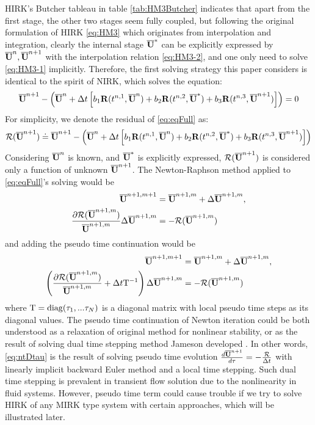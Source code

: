 \documentclass[preprint,12pt]{elsarticle}
\begin{document}
HIRK's Butcher tableau in table \ref{tab:HM3Butcher}
indicates that apart from the first stage,
the other two stages seem fully coupled,
but following the original formulation
of HIRK \eqref{eq:HM3} which originates from
interpolation and integration,
clearly the internal stage $\overline{\mathbf{U}}^*$ can be explicitly
expressed by $\overline{\mathbf{U}}^n, \overline{\mathbf{U}}^{n+1}$ with the interpolation
relation \eqref{eq:HM3-2}, and one only need
to solve \eqref{eq:HM3-1} implicitly.
Therefore, the first solving strategy this paper
considers is identical to the spirit of NIRK,
which solves the equation:
\begin{equation}
    \label{eq:eqFull}
    \overline{\mathbf{U}}^{n+1} -
    \left(\overline{\mathbf{U}}^{n} + \mathrm\Delta t
    \left[
        b_1\mathbf{R}(t^{n,1}, \overline{\mathbf{U}}^n) +
        b_2\mathbf{R}(t^{n,2}, \overline{\mathbf{U}}^*) +
        b_3\mathbf{R}(t^{n,3}, \overline{\mathbf{U}}^{n+1})
        \right]
    \right)  =  0
\end{equation}
For simplicity, we denote the residual of \eqref{eq:eqFull}
as:
\begin{equation}
    \mathcal{R}(\overline{\mathbf{U}}^{n+1}) \doteq \overline{\mathbf{U}}^{n+1} -
    \left(\overline{\mathbf{U}}^{n} + \mathrm\Delta t
    \left[
        b_1\mathbf{R}(t^{n,1}, \overline{\mathbf{U}}^{n}) +
        b_2\mathbf{R}(t^{n,2}, \overline{\mathbf{U}}^{*}) +
        b_3\mathbf{R}(t^{n,3}, \overline{\mathbf{U}}^{n+1})
        \right]
    \right)
\end{equation}
Considering $\overline{\mathbf{U}}^{n}$ is known,
and $\overline{\mathbf{U}}^{*}$ is explicitly expressed,
$\mathcal{R}(\overline{\mathbf{U}}^{n+1})$ is considered only a
function of unknown $\overline{\mathbf{U}}^{n+1}$.
The Newton-Raphson method applied to
\eqref{eq:eqFull}'s solving would be
\begin{equation}
    \begin{aligned}
        \overline{\mathbf{U}}^{n+1,m+1}                  & =  \overline{\mathbf{U}}^{n+1,m} + \mathrm\Delta \overline{\mathbf{U}}^{n+1,m}, \\
        \frac{\partial \mathcal{R}(\overline{\mathbf{U}}^{n+1,m})}
        {\overline{\mathbf{U}}^{n+1,m}} \mathrm\Delta \overline{\mathbf{U}}^{n+1,m} & = - \mathcal{R}(\overline{\mathbf{U}}^{n+1,m})
    \end{aligned}
\end{equation}
and adding the pseudo time continuation
would be
\begin{equation}
    \label{eq:ntDtau}
    \begin{aligned}
        \overline{\mathbf{U}}^{n+1,m+1}            & =  \overline{\mathbf{U}}^{n+1,m} + \mathrm\Delta \overline{\mathbf{U}}^{n+1,m}, \\
        \left(
        \frac{\partial \mathcal{R}(\overline{\mathbf{U}}^{n+1,m})}
        {\overline{\mathbf{U}}^{n+1,m}} + \mathrm\Delta t \mathrm{T}^{-1}
        \right) \mathrm\Delta \overline{\mathbf{U}}^{n+1,m} & = - \mathcal{R}(\overline{\mathbf{U}}^{n+1,m})
    \end{aligned}
\end{equation}
where $\mathrm{T}=\mathrm{diag}(\tau_1,...\tau_N)$ is a diagonal matrix with
local pseudo time steps as its diagonal values.
The pseudo time continuation of Newton iteration
could be both understood as a relaxation of original
method for nonlinear stability,
or as the result of solving dual time stepping
method Jameson developed \cite{jameson1991time}.
In other words, \eqref{eq:ntDtau} is the result
of solving pseudo time evolution
$\frac{d\overline{\mathbf{U}}^{n+1}}{d\tau} = -\frac{\mathcal{R}}{\mathrm\Delta t}$
with linearly implicit backward Euler method and
a local time stepping.
Such dual time stepping is prevalent in transient
flow solution due to the nonlinearity in
fluid systems.
However, pseudo time term could
cause trouble if we try to solve HIRK
of any MIRK type system with certain approaches, which
will be illustrated later.
\end{document}
